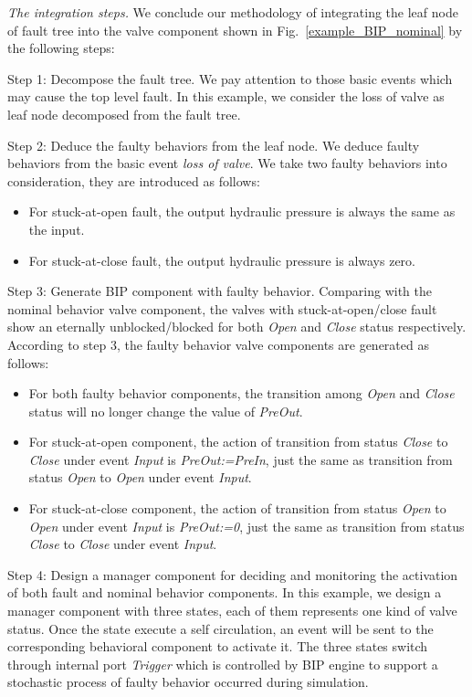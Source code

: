 \emph{The integration steps.} We conclude our methodology of integrating the leaf node of fault tree into the valve component shown in Fig.~\ref{example_BIP_nominal} by the following steps:

Step 1: Decompose the fault tree. We pay attention to those basic events which may cause the top level fault. In this example, we consider the loss of valve as leaf node decomposed from the fault tree.

Step 2: Deduce the faulty behaviors from the leaf node. 
We deduce faulty behaviors from the basic event \emph{loss of valve}. We take two faulty behaviors into consideration, they are introduced as follows:

\begin{itemize}
	\item For stuck-at-open fault, the output hydraulic pressure is always the same as the input.
	\item For stuck-at-close fault, the output hydraulic pressure is always zero.
\end{itemize}

Step 3: Generate BIP component with faulty behavior. Comparing with the nominal behavior valve component, the valves with stuck-at-open/close fault show an eternally unblocked/blocked for both \emph{Open} and \emph{Close} status respectively. According to step 3, the faulty behavior valve components are generated as follows:

\begin{itemize}
	\item For both faulty behavior components, the transition among \emph{Open} and \emph{Close} status will no longer change the value of \emph{PreOut}.
	\item For stuck-at-open component, the action of transition from status \emph{Close} to \emph{Close} under event \emph{Input} is \emph{PreOut:=PreIn}, just the same as transition from status \emph{Open} to \emph{Open} under event \emph{Input}.
	\item For stuck-at-close component, the action of transition from status \emph{Open} to \emph{Open} under event \emph{Input} is \emph{PreOut:=0}, just the same as transition from status \emph{Close} to \emph{Close} under event \emph{Input}.
\end{itemize}

Step 4: Design a manager component for deciding and monitoring the activation of both fault and nominal behavior components. In this example, we design a manager component with three states, each of them represents one kind of valve status. Once the state execute a self circulation, an event will be sent to the corresponding behavioral component to activate it. The three states switch through internal port \emph{Trigger} which is controlled by BIP engine to support a stochastic process of faulty behavior occurred during simulation.

